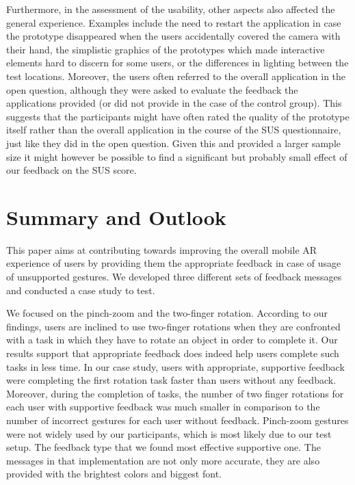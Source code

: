 \documentclass[manuscript]{acmart}
\begin{document}
			Furthermore, in the assessment of the usability, other aspects also affected the general experience. Examples include the need to restart the application in case the prototype disappeared when the users accidentally covered the camera with their hand, the simplistic graphics of the prototypes which made interactive elements hard to discern for some users, or the differences in lighting between the test locations. Moreover, the users often referred to the overall application in the open question, although they were asked to evaluate the feedback the applications provided (or did not provide in the case of the control group). This suggests that the participants might have often rated the quality of the prototype itself rather than the overall application in the course of the SUS questionnaire, just like they did in the open question. Given this and provided a larger sample size it might however be possible to find a significant but probably small effect of our feedback on the SUS score.

	\section{Summary and Outlook}\label{sec:summary}
		This paper aims at contributing towards improving the overall mobile \ac{AR} experience of users by providing them the appropriate feedback in case of usage of unsupported gestures. We developed three different sets of feedback messages and conducted a case study to test.
		
		We focused on the pinch-zoom and the two-finger rotation. According to our findings, users are inclined to use two-finger rotations when they are confronted with a task in which they have to rotate an object in order to complete it. Our results support that appropriate feedback does indeed help users complete such tasks in less time. In our case study, users with appropriate, supportive feedback were completing the first rotation task faster than users without any feedback. Moreover, during the completion of tasks, the number of two finger rotations for each user with supportive feedback was much smaller in comparison to the number of incorrect gestures for each user without feedback. Pinch-zoom gestures were not widely used by our participants, which is most likely due to our test setup. The feedback type that we found most effective supportive one. The messages in that implementation are not only more accurate, they are also provided with the brightest colors and biggest font.
\end{document}
